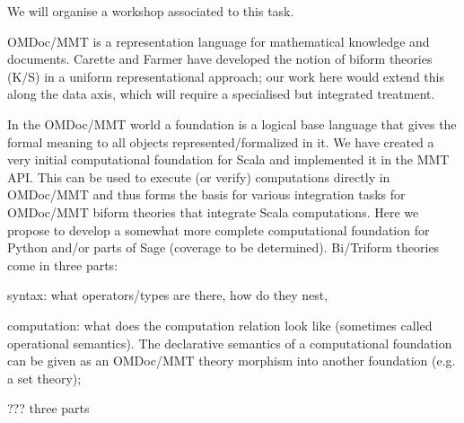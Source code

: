 \begin{workpackage}[id=dksbases,wphases=1-48!.5,
  title=Data/Knowledge/Software-Bases,lead=JU,
  ZHRM=1,JURM=36,USHRM=12,UWRM=3]
\begin{tasklist}
\begin{task}[title={Design of new infrastructure, formulation of requirements}, id=data-design]
We will organise a workshop associated to this task.
\end{task}

\begin{task}[title=Triform Theories in OMDoc/MMT,id=data-triform]
OMDoc/MMT is a representation language for mathematical knowledge and documents. Carette and Farmer have developed the notion of biform theories (K/S) in a uniform representational approach; our work here would extend this along the data axis, which will require a specialised but integrated treatment.
\end{task}

\begin{task}[title=Computational Foundation for Python/Sage (or some CAS),id=data-foundationCAS]
In the OMDoc/MMT world a foundation is a logical base language that gives the formal meaning to all objects represented/formalized in it. We have created a very initial computational foundation for Scala and implemented it in the MMT API. This can be used to execute (or verify) computations directly in OMDoc/MMT and thus forms the basis for various integration tasks for OMDoc/MMT biform theories that integrate Scala computations. Here we propose to develop a somewhat more complete computational foundation for Python and/or parts of Sage (coverage to be determined). Bi/Triform theories come in three parts:
\begin{compactitem}
\item syntax: what operators/types are there, how do they nest, 
\item computation:  what does the computation relation look like (sometimes called operational semantics). The declarative semantics of a computational foundation can be given as an OMDoc/MMT theory morphism into another foundation (e.g. a set theory);
\item ??? three parts
\end{compactitem}
\end{task}


\end{tasklist}
\end{workpackage}
